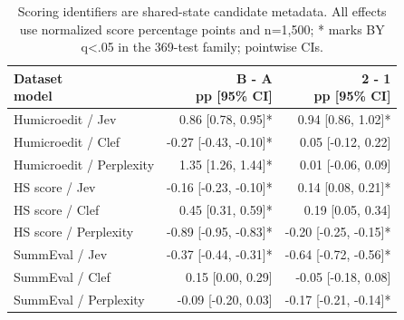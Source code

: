 \begin{table}[t]
\centering\footnotesize
\setlength{\tabcolsep}{3.5pt}
\begin{tabular}{@{}lrr@{}}
\toprule
\shortstack[l]{Dataset\\{}model} & \shortstack[l]{B - A\\{}pp [95\% CI]} & \shortstack[l]{2 - 1\\{}pp [95\% CI]} \\
\midrule
Humicroedit / Jev & 0.86 [0.78, 0.95]* & 0.94 [0.86, 1.02]* \\
Humicroedit / Clef & -0.27 [-0.43, -0.10]* & 0.05 [-0.12, 0.22] \\
Humicroedit / Perplexity & 1.35 [1.26, 1.44]* & 0.01 [-0.06, 0.09] \\
HS score / Jev & -0.16 [-0.23, -0.10]* & 0.14 [0.08, 0.21]* \\
HS score / Clef & 0.45 [0.31, 0.59]* & 0.19 [0.05, 0.34] \\
HS score / Perplexity & -0.89 [-0.95, -0.83]* & -0.20 [-0.25, -0.15]* \\
SummEval / Jev & -0.37 [-0.44, -0.31]* & -0.64 [-0.72, -0.56]* \\
SummEval / Clef & 0.15 [0.00, 0.29] & -0.05 [-0.18, 0.08] \\
SummEval / Perplexity & -0.09 [-0.20, 0.03] & -0.17 [-0.21, -0.14]* \\
\bottomrule
\end{tabular}
\caption{Scoring identifiers are shared-state candidate metadata. All effects use normalized score percentage points and n=1,500; * marks BY q<.05 in the 369-test family; pointwise CIs.}
\label{tab:appendix_score_identifiers}
\end{table}
